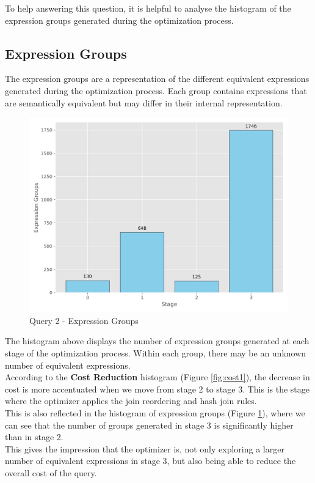 \documentclass[a4paper,12pt]{scrreprt}
\begin{document}
To help answering this question, it is helpful to analyse the histogram of the expression groups generated during the optimization process. 

\subsection{Expression Groups}

The expression groups are a representation of the different equivalent expressions generated during the optimization process. Each group contains expressions that are semantically equivalent but may differ in their internal representation. \\

\begin{figure}[H]
    \centering
    \includegraphics[width=0.80\linewidth]{img/expression_groups/q2_expression_groups.png}
    \caption{Query 2 - Expression Groups}
    \label{fig:exprgroups2}
\end{figure}

The histogram above displays the number of expression groups generated at each stage of the optimization process. Within each group, there may be an unknown number of equivalent expressions. \\

According to the \textbf{Cost Reduction} histogram (Figure \ref{fig:cost1}), the decrease in cost is more accentuated when we move from stage 2 to stage 3. This is the stage where the optimizer applies the join reordering and hash join rules. \\
This is also reflected in the histogram of expression groups (Figure \ref{fig:exprgroups2}), where we can see that the number of groups generated in stage 3 is significantly higher than in stage 2. \\
This gives the impression that the optimizer is, not only exploring a larger number of equivalent expressions in stage 3, but also being able to reduce the overall cost of the query. \\
\end{document}
